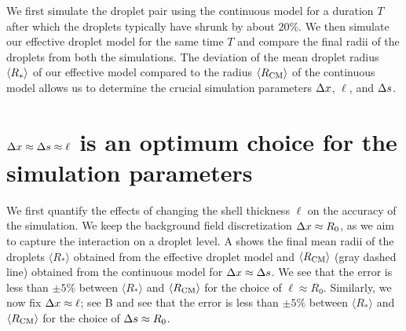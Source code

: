 We first simulate the droplet pair using the continuous model for a duration $T$ after which the droplets typically have shrunk by about $20\%$.
We then simulate our effective droplet model for the same time $T$ and compare the final radii of the droplets from both the simulations. 
The deviation of the mean droplet radius $\langle R_*\rangle$ of our effective model compared to the radius $\langle R_\mathrm{CM}\rangle$ of the continuous model allows us to determine the crucial simulation parameters $\Delta x$, $\ell$, and $\Delta s$.

\section{$\Delta x \approx \Delta s \approx \ell$ is an optimum choice for the simulation parameters}

We first quantify the effects of changing the shell thickness $\ell$ on the accuracy of the simulation.
We keep the background field discretization $\Delta x \approx R_0$, as we aim to capture the interaction on a droplet level.  
A shows the final mean radii of the droplets $\langle R_\ast \rangle$ obtained from the effective droplet model and $\langle R_\mathrm{CM}\rangle$ (gray dashed line) obtained from the continuous model for $\Delta x \approx \Delta s$.
We see that the error is less than $\pm 5\%$  between $\langle R_\ast \rangle$ and $\langle R_\mathrm{CM}\rangle$ for the choice of $\ell \approx R_0$.
Similarly, we now fix $\Delta x \approx \ell$; see B and see that the error is less than $\pm 5\%$  between $\langle R_\ast \rangle$ and $\langle R_\mathrm{CM}\rangle$ for the choice of $\Delta s \approx R_0$.

